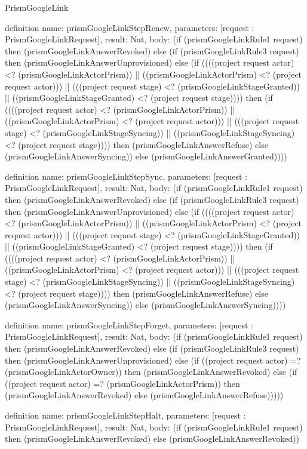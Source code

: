 \begin{lexlean}{PrismGoogleLink}
\begin{semanticmodule}
definition{
  name: prismGoogleLinkStepRenew,
  parameters: [request : PrismGoogleLinkRequest],
  result: Nat,
  body: (if (prismGoogleLinkRule1 request) then (prismGoogleLinkAnswerRevoked) else (if (prismGoogleLinkRule3 request) then (prismGoogleLinkAnswerUnprovisioned) else (if ((((project request actor) <? (prismGoogleLinkActorPrism)) || ((prismGoogleLinkActorPrism) <? (project request actor))) || (((project request stage) <? (prismGoogleLinkStageGranted)) || ((prismGoogleLinkStageGranted) <? (project request stage)))) then (if ((((project request actor) <? (prismGoogleLinkActorPrism)) || ((prismGoogleLinkActorPrism) <? (project request actor))) || (((project request stage) <? (prismGoogleLinkStageSyncing)) || ((prismGoogleLinkStageSyncing) <? (project request stage)))) then (prismGoogleLinkAnswerRefuse) else (prismGoogleLinkAnswerSyncing)) else (prismGoogleLinkAnswerGranted))))
}

definition{
  name: prismGoogleLinkStepSync,
  parameters: [request : PrismGoogleLinkRequest],
  result: Nat,
  body: (if (prismGoogleLinkRule1 request) then (prismGoogleLinkAnswerRevoked) else (if (prismGoogleLinkRule3 request) then (prismGoogleLinkAnswerUnprovisioned) else (if ((((project request actor) <? (prismGoogleLinkActorPrism)) || ((prismGoogleLinkActorPrism) <? (project request actor))) || (((project request stage) <? (prismGoogleLinkStageGranted)) || ((prismGoogleLinkStageGranted) <? (project request stage)))) then (if ((((project request actor) <? (prismGoogleLinkActorPrism)) || ((prismGoogleLinkActorPrism) <? (project request actor))) || (((project request stage) <? (prismGoogleLinkStageSyncing)) || ((prismGoogleLinkStageSyncing) <? (project request stage)))) then (prismGoogleLinkAnswerRefuse) else (prismGoogleLinkAnswerSyncing)) else (prismGoogleLinkAnswerSyncing))))
}

definition{
  name: prismGoogleLinkStepForget,
  parameters: [request : PrismGoogleLinkRequest],
  result: Nat,
  body: (if (prismGoogleLinkRule1 request) then (prismGoogleLinkAnswerRevoked) else (if (prismGoogleLinkRule3 request) then (prismGoogleLinkAnswerUnprovisioned) else (if ((project request actor) =? (prismGoogleLinkActorOwner)) then (prismGoogleLinkAnswerRevoked) else (if ((project request actor) =? (prismGoogleLinkActorPrism)) then (prismGoogleLinkAnswerRevoked) else (prismGoogleLinkAnswerRefuse)))))
}

definition{
  name: prismGoogleLinkStepHalt,
  parameters: [request : PrismGoogleLinkRequest],
  result: Nat,
  body: (if (prismGoogleLinkRule1 request) then (prismGoogleLinkAnswerRevoked) else (prismGoogleLinkAnswerRevoked))
}


\end{semanticmodule}
\end{lexlean}
